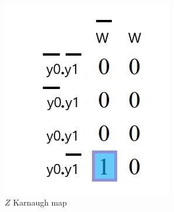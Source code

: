 \documentclass[../../e3_tp3_main.tex]{subfiles}
\begin{document}
\begin{figure}[H]
	\centering
	\includegraphics[scale=0.9]{figures/e3_tp3_ej2_mealy_z_kmap.jpg}
	\caption{$Z$ Karnaugh map}
\end{figure}
\end{document}
